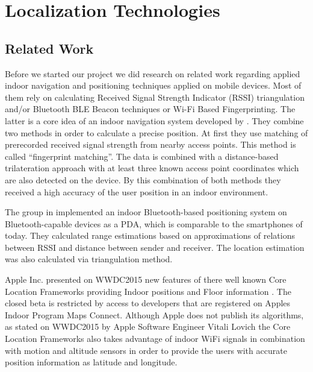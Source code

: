 \chapter{Localization Technologies}
\label{cha:relatedwork}

\section{Related Work}

Before we started our project we did research on related work regarding applied indoor navigation and positioning techniques applied on mobile devices. Most of them rely on calculating Received Signal Strength Indicator (RSSI) triangulation and/or Bluetooth BLE Beacon techniques or Wi-Fi Based Fingerprinting. The latter is a core idea of an indoor navigation system developed by \cite{ChaSo2012}. They combine two methods in order to calculate a precise position. At first they use matching of prerecorded received signal strength from nearby access points. This method is called \enquote{fingerprint matching}. The data is combined with a distance-based trilateration approach with at least three known access point coordinates which are also detected on the device. By this combination of both methods they received a high accuracy of the user position in an indoor environment.

The group in \cite{feldmann2003indoor} implemented an indoor Bluetooth-based positioning system on Bluetooth-capable devices as a PDA, which is comparable to the smartphones of today. They calculated range estimations based on approximations of relations between RSSI and distance between sender and receiver. The location estimation was also calculated via triangulation method.

Apple Inc. presented on WWDC2015 new features of there well known Core Location Frameworks providing Indoor positions and Floor information \cite{wwdc15}. The closed beta is restricted by access to developers that are registered on Apples Indoor Program Maps Connect. Although Apple does not publish its algorithms, as stated on WWDC2015 by Apple Software Engineer Vitali Lovich the Core Location Frameworks also takes advantage of indoor WiFi signals in combination with motion and altitude sensors in order to provide the users with accurate position information as latitude and longitude.

